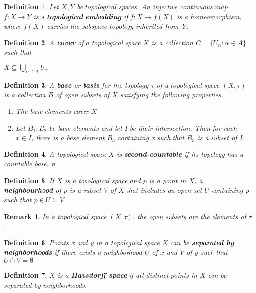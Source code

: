 \documentclass[12pt]{article}
\newcommand\set[1]{\{#1\}}
\newtheorem{defn}{Definition}[thm]
\newtheorem*{remark}{Remark}
\begin{document}
\begin{defn}
  Let $X,Y$ be topological spaces. An injective continuous map $f:X \to Y$ is a \textbf{topological embedding} if $f:X \to f(X)$ is a homeomorphism, where $f(X)$ carries the subspace topology inherited from Y. 
\end{defn}
\begin{defn}
  A \textbf{cover} of a topological space $X$ is a collection $C = \set{U_{\alpha} : \alpha \in A}$ such that
  \begin{center}
    $X \subseteq \bigcup\limits_{\alpha \in A} U_{\alpha}$
  \end{center}
\end{defn}
\begin{defn}
  A \textbf{base} or \textbf{basis} for the topology $\tau$ of a topological space $(X,\tau)$ is a collection $B$ of open subsets of $X$ satisfying the following properties.
  \begin{enumerate}
  \item The base elements cover $X$
  \item Let $B_1, B_2$ be base elements and let $I$ be their intersection. Then for each $x \in I$, there is a base element $B_3$ containing x such that $B_3$ is a subset of $I$.
  \end{enumerate}
\end{defn}

\begin{defn}
  A topological space $X$ is \textbf{second-countable} if its topology has a countable base.
n\end{defn}

\begin{defn}
  If $X$ is a topological space and $p$ is a point in $X$, a \textbf{neighbourhood}
  of $p$ is a subset $V$ of $X$ that includes an open set $U$ containing p such that $ p \in U \subseteq V$
\end{defn}
\begin{remark}
  In a topological space $(X, \tau)$, the open subsets are the elements of $\tau$.
\end{remark}
\begin{defn}
  Points x and y in a topological space $X$ can be \textbf{separated by neighborhoods}
  if there exists a neighborhood $U$ of $x$ and $V$ of $y$ such that $U \cap V = \emptyset$
\end{defn}
\begin{defn}
  $X$ is a \textbf{Hausdorff space} if all distinct points in $X$ can be separated by neighborhoods.
\end{defn}
\end{document}

